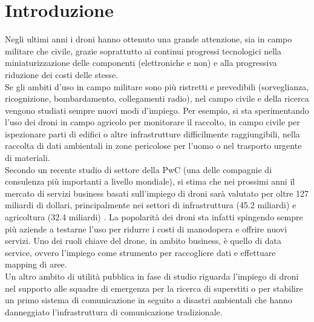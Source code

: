 
\chapter{Introduzione}  %

\ifpdf
    \graphicspath{{Chapter1/Figs/Raster/}{Chapter1/Figs/PDF/}{Chapter1/Figs/}}
\else
    \graphicspath{{Chapter1/Figs/Vector/}{Chapter1/Figs/}}
\fi

Negli ultimi anni i droni hanno ottenuto una grande attenzione, sia in campo militare che civile, grazie soprattutto ai continui progressi tecnologici nella miniaturizzazione delle componenti (elettroniche e non) e alla progressiva riduzione dei costi delle stesse. \\
Se gli ambiti d'uso in campo militare sono più ristretti e prevedibili (sorveglianza, ricognizione, bombardamento, collegamenti radio), nel campo civile e della ricerca vengono studiati sempre nuovi modi d'impiego. 
Per esempio, si sta sperimentando l'uso dei droni in campo agricolo per monitorare il raccolto, in campo civile per ispezionare parti di edifici o altre infrastrutture difficilmente raggiungibili, nella raccolta di dati ambientali in zone pericolose per l'uomo o nel trasporto urgente di materiali.\\
Secondo un recente studio di settore della PwC (una delle compagnie di consulenza più importanti a livello mondiale), si stima che nei prossimi anni il mercato di servizi business basati sull'impiego di droni sarà valutato per oltre 127 miliardi di dollari, principalmente nei settori di infrastruttura (45.2 miliardi) e agricoltura (32.4 miliardi) \cite{pwc2016}. La popolarità dei droni sta infatti spingendo sempre più aziende a testarne l'uso per ridurre i costi di manodopera e offrire nuovi servizi. Uno dei ruoli chiave del drone, in ambito business, è quello di data service, ovvero l'impiego come strumento per raccogliere dati e effettuare mapping di aree. \\
Un altro ambito di utilità pubblica in fase di studio riguarda l'impiego di droni nel supporto alle squadre di emergenza per la ricerca di superstiti o per stabilire un primo sistema di comunicazione in seguito a disastri ambientali che hanno danneggiato l'infrastruttura di comunicazione tradizionale. \\
